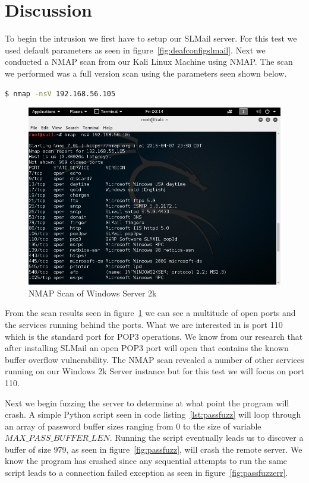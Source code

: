 \documentclass[12pt]{article}
\begin{document}
\section{Discussion}
\label{sect:discussion}
To begin the intrusion we first have to setup our SLMail server. For this
test we used default parameters as seen in figure~\ref{fig:deafconfigslmail}.
Next we conducted a NMAP scan from our Kali Linux Machine using NMAP. The
scan we performed was a full version scan using the parameters seen shown 
below.

\begin{lstlisting}[language=bash]
    $ nmap -nsV 192.168.56.105
\end{lstlisting}

\begin{figure}[ht]
    \centering
    \includegraphics[width=5.5in]{images/20160407_nmap_scan.png}
    \caption{NMAP Scan of Windows Server 2k}
    \label{fig:nmapwindows}
\end{figure}

From the scan results seen in figure~\ref{fig:nmapwindows} we can see a
multitude of open ports and the services running behind the ports. What we are
interested in is port 110 which is the standard port for POP3 operations. We
know from our research that after installing SLMail an open POP3 port will
open that contains the known buffer overflow vulnerability. The NMAP scan 
revealed a number of other services running on our Windows 2k Server instance 
but for this test we will focus on port 110. 

Next we begin fuzzing the server to determine at what point the program 
will crash. A simple Python script seen in code listing~\ref{lst:passfuzz}
will loop through an array of password buffer sizes ranging from 0 to
the size of variable $MAX\_PASS\_BUFFER\_LEN$. Running the script eventually
leads us to discover a buffer of size 979, as seen in 
figure~\ref{fig:passfuzz}, will crash the remote server. We know the program
has crashed since any sequential attempts to run the same script leads to 
a connection failed exception as seen in figure~\ref{fig:passfuzzerr}.
\end{document}
